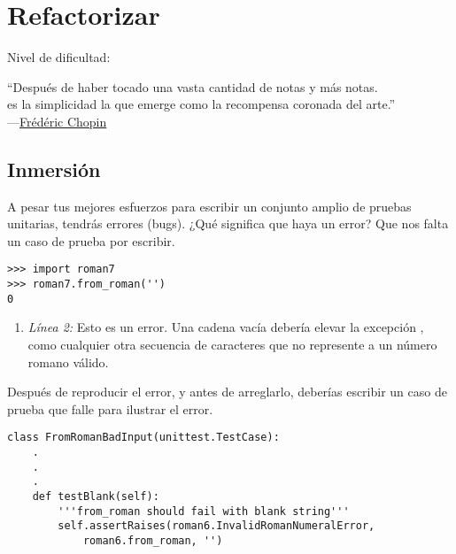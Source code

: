 
\chapter{Refactorizar}\label{ch:refactorizar}

\noindent
Nivel de dificultad:\difllll

\begin{citaCap}
``Después de haber tocado una vasta cantidad de notas y más notas. \\
es la simplicidad la que emerge como la recompensa coronada del arte.'' \\
---\href{http://en.wikiquote.org/wiki/Frédéric\_Chopin}{Frédéric Chopin}
\end{citaCap}

\section{Inmersión}

A pesar tus mejores esfuerzos para escribir un conjunto amplio de pruebas unitarias, tendrás errores (bugs). ¿Qué significa que haya un error? Que nos falta un caso de prueba por escribir.

\noindent\begin{minipage}{\textwidth}
\begin{lstlisting}[mathescape=True]
>>> import roman7
>>> roman7.from_roman('')
0
\end{lstlisting}
\end{minipage}

\begin{enumerate}

\item \emph{Línea 2:} Esto es un error. Una cadena vacía debería elevar la excepción , como cualquier otra secuencia de caracteres que no represente a un número romano válido.

\end{enumerate}

Después de reproducir el error, y antes de arreglarlo, deberías escribir un caso de prueba que falle para ilustrar el error.

\noindent\begin{minipage}{\textwidth}
\begin{lstlisting}[mathescape=True]
class FromRomanBadInput(unittest.TestCase):  
    .
    .
    .
    def testBlank(self):
        '''from_roman should fail with blank string'''
        self.assertRaises(roman6.InvalidRomanNumeralError, 
            roman6.from_roman, '') 
\end{lstlisting}
\end{minipage}

